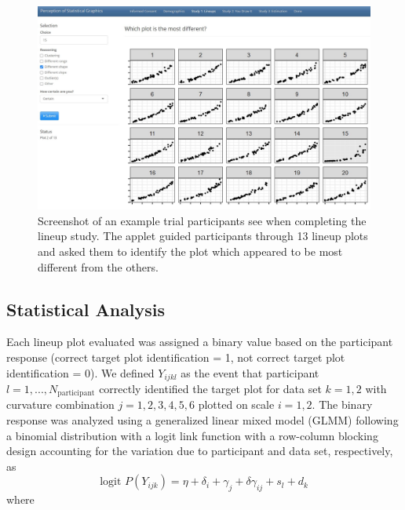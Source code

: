 \documentclass[12pt]{article}
\begin{document}
\begin{figure}[tbp]

{\centering \includegraphics[width=1\linewidth,]{images/lineup-study-example-trial} 

}

\caption[Lineup study example trial]{Screenshot of an example trial participants see when completing the lineup study. The applet guided participants through 13 lineup plots and asked them to identify the plot which appeared to be most different from the others.}\label{fig:lineup-study-example-trial}
\end{figure}

\hypertarget{statistical-analysis}{%
\subsection{Statistical Analysis}\label{statistical-analysis}}

Each lineup plot evaluated was assigned a binary value based on the
participant response (correct target plot identification = 1, not
correct target plot identification = 0). We defined \(Y_{ijkl}\) as the
event that participant \(l = 1,...,N_\text{participant}\) correctly
identified the target plot for data set \(k = 1,2\) with curvature
combination \(j = 1,2,3,4,5,6\) plotted on scale \(i = 1,2\). The binary
response was analyzed using a generalized linear mixed model (GLMM)
following a binomial distribution with a logit link function with a
row-column blocking design accounting for the variation due to
participant and data set, respectively, as \begin{equation}
\text{logit }P(Y_{ijk}) = \eta + \delta_i + \gamma_j + \delta \gamma_{ij} + s_l + d_k
\end{equation} \noindent where
\end{document}
